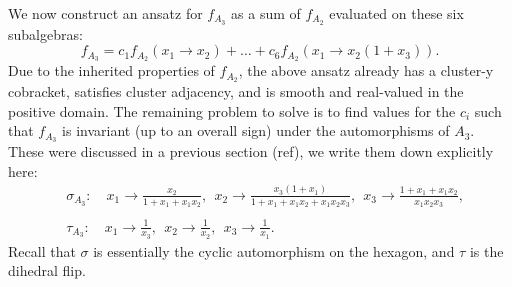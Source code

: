 \documentclass[12pt]{article}
\def\nl{\nonumber\\}
\def\nn{\nonumber}
\begin{document}
We now construct an ansatz for $f_{A_3}$ as a sum of $f_{A_2}$ evaluated on these six subalgebras:
\begin{equation}
	f_{A_3} = c_1 f_{A_2}(x_1 \to x_2) + \ldots + c_6 f_{A_2}(x_1\to x_2 \left(1+x_3\right)). 
\end{equation}	
Due to the inherited properties of $f_{A_2}$, the above ansatz already has a cluster-y cobracket, satisfies cluster adjacency, and is smooth and real-valued in the positive domain. The remaining problem to solve is to find values for the $c_i$ such that $f_{A_3}$ is invariant (up to an overall sign) under the automorphisms of $A_3$. These were discussed in a previous section (ref), we write them down explicitly here:
\begin{align}
	&\sigma_{A_3}:\quad x_1 \to \frac{x_2}{1+x_1 + x_1 x_2}, ~~x_2 \to \frac{x_3(1+x_1)}{1+x_1 + x_1x_2 +x_1x_2x_3},~~ x_3 \to \frac{1+x_1 + x_1 x_2}{x_1x_2x_3},\nl \\
	&\tau_{A_3}:\quad x_1 \to \frac{1}{x_3}, ~~x_2\to\frac{1}{x_2},~~x_3\to \frac{1}{x_1}.\nn
\end{align}
Recall that $\sigma$ is essentially the cyclic automorphism on the hexagon, and $\tau$ is the dihedral flip. 
\end{document}
